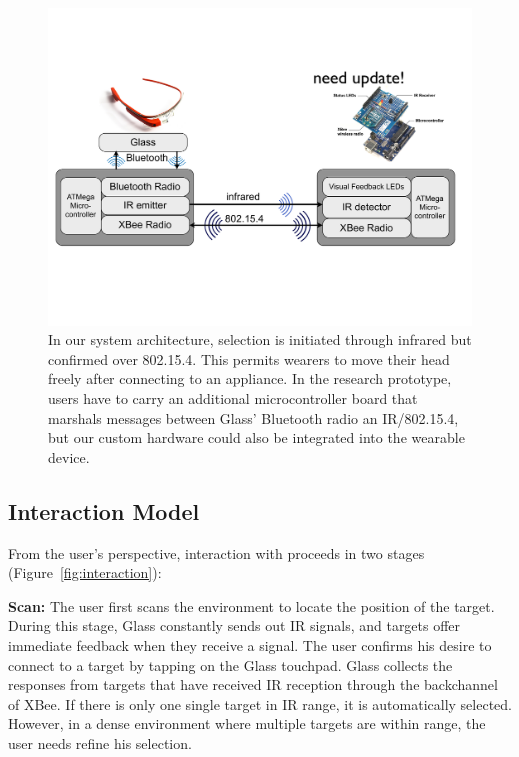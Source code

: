 \begin{figure}[t]
\centering
\includegraphics[width=1.0\columnwidth]{figures/architecture}
\caption{In our system architecture, selection is initiated through infrared but confirmed over 802.15.4. This permits wearers to move their head freely after connecting to an appliance. In the research prototype, users have to carry an additional microcontroller board that marshals messages between Glass' Bluetooth radio an IR/802.15.4, but our custom hardware could also be integrated into the wearable device.}
\label{fig:architecture}
\end{figure}



\subsection{Interaction Model}
From the user's perspective, interaction with \systemname proceeds in two stages (Figure~\ref{fig:interaction}): 

{\bf Scan:} The user first scans the environment to locate the position of the target. During this stage, Glass constantly sends out IR signals, and  targets offer immediate feedback when they receive a signal. The user confirms his desire to connect to a target by tapping on the Glass touchpad. Glass collects the responses from targets that have received IR reception through the backchannel of XBee. If there is only one single target in IR range, it is automatically selected. However, in a dense environment where multiple targets are within range, the user needs refine his selection.


